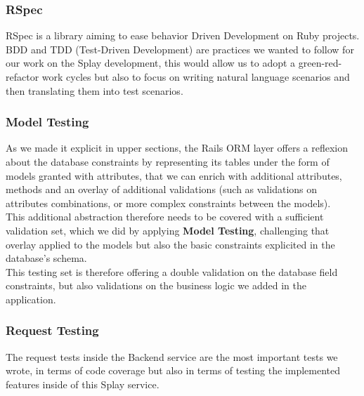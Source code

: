 \documentclass{eplmastersthesis}
\begin{document}
        \subsubsection{RSpec}

          RSpec \cite{rspec} is a library aiming to ease behavior Driven
          Development on Ruby projects. BDD and TDD (Test-Driven Development) are
          practices we wanted to follow for our work on the Splay development,
          this would allow us to adopt a green-red-refactor work cycles but also
          to focus on writing natural language scenarios and then translating
          them into test scenarios.

        \subsubsection{Model Testing}

          As we made it explicit in upper sections, the Rails ORM layer offers
          a reflexion about the database constraints by representing its
          tables under the form of models granted with attributes, that we can
          enrich with additional attributes, methods and an overlay of
          additional validations (such as validations on attributes
          combinations, or more complex constraints between the models).\\

          This additional abstraction therefore needs to be covered with a
          sufficient validation set, which we did by applying
          \textbf{Model Testing}, challenging that overlay applied to the
          models but also the basic constraints explicited in the database's
          schema.\\

          This testing set is therefore offering a double validation on the
          database field constraints, but also validations on the business
          logic we added in the application.

        \subsubsection{Request Testing}

          The request tests inside the Backend service are the most important
          tests we wrote, in terms of code coverage but also in terms of
          testing the implemented features inside of this Splay service.\\
\end{document}
